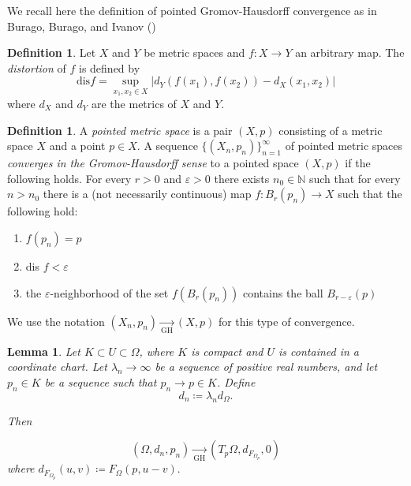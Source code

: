 \documentclass[letterpaper, 11pt, reqno]{amsart}
\newtheorem{lemma}[thm]{Lemma}
\theoremstyle{definition}
\newtheorem{dfn}[thm]{Definition}
\begin{document}
We recall here the definition of pointed Gromov-Hausdorff convergence as in Burago, Burago, and Ivanov (\cite{burago2001course})

\begin{dfn}
    Let $X$ and $Y$ be metric spaces and $f: X \rightarrow Y$ an arbitrary map. The \textit{distortion} of $f$ is defined by
    \begin{equation}
        \text{dis} f=\sup_{x_1,x_2\in X}|d_Y(f(x_1),f(x_2))-d_X(x_1,x_2)|
    \end{equation}
    where $d_X$ and $d_Y$ are the metrics of $X$ and $Y$.
\end{dfn}

\begin{dfn}\label{GHdef}
    A \textit{pointed metric space} is a pair $(X,p)$ consisting of a metric space $X$ and a point $p\in X$.
    A sequence $\{(X_n,p_n)\}_{n=1}^\infty$ of pointed metric spaces \textit{converges in the Gromov-Hausdorff sense} to a pointed space $(X,p)$ if the following holds. For every $r>0$ and $\varepsilon>0$ there exists $n_0 \in \mathbb{N}$ such that for every $n > n_0$ there is a (not necessarily continuous) map $f: B_r(p_n) \rightarrow X$ such that the following hold:
    \begin{enumerate}
        \item $f(p_n)=p$
        \item dis $f<\varepsilon$
        \item the $\varepsilon$-neighborhood of the set $f(B_r(p_n))$ contains the ball $B_{r-\varepsilon}(p)$
    \end{enumerate}
    We use the notation $(X_n,p_n) \xrightarrow[\text{GH}]{\text{}} (X,p)$ for this type of convergence.
\end{dfn}

\begin{lemma}\label{GHconvergence}
    Let $K \subset U \subset \Omega$, where $K$ is compact and $U$ is contained in a coordinate chart. Let $\lambda_n \longrightarrow \infty$ be a sequence of positive real numbers, and let $p_n \in K$ be a sequence such that $p_n \longrightarrow p \in K$. Define
    \begin{equation}
        d_n \coloneq \lambda_nd_\Omega.
    \end{equation}
    
    Then 
    
    \begin{equation}
     (\Omega,d_n,p_n) \xrightarrow[\text{GH}]{\text{}} (T_p\Omega,d_{F_{{\Omega_p}}},0)   
    \end{equation}
    where $d_{F_{{\Omega_p}}}(u,v) \coloneq F_\Omega(p,u- v).$
\end{lemma}
\end{document}
